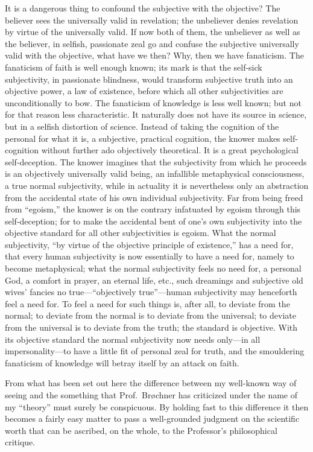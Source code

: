 \documentclass[12pt]{book}
\newcommand{\opage}[1]{\marginnote{\footnotesize\textit{[#1]}}}
\begin{document}
It is a dangerous thing to confound the subjective with the objective?
The believer sees the universally valid in revelation; the unbeliever
denies revelation by virtue of the universally valid. If now both of
them, the unbeliever as well as the believer, in selfish, passionate zeal
go and confuse the subjective universally valid with the objective, what
have we then? Why, then we have fanaticism. The fanaticism of faith is
well enough known; its mark is that the self-sick subjectivity, in
passionate blindness, would transform subjective truth into an objective
power, a law of existence, before which all other subjectivities are
unconditionally to
\opage{19}\setcounter{footnote}{0}%
bow. The fanaticism of knowledge is less well known; but not for that
reason less characteristic. It naturally does not have its source in
science, but in a selfish distortion of science. Instead of taking the
cognition of the personal for what it is, a subjective, practical
cognition, the knower makes self-cognition without further ado
objectively theoretical. It is a great psychological self-deception. The
knower imagines that the subjectivity from which he proceeds is an
objectively universally valid being, an infallible metaphysical
consciousness, a true normal subjectivity, while in actuality it is
nevertheless only an abstraction from the accidental state of his own
individual subjectivity. Far from being freed from ``egoism,'' the knower
is on the contrary infatuated by egoism through this self-deception; for
to make the accidental bent of one's own subjectivity into the objective
standard for all other subjectivities is egoism. What the normal
subjectivity, ``by virtue of the objective principle of existence,'' has a
need for, that every human subjectivity is now essentially to have a need
for, namely to become metaphysical; what the normal subjectivity feels no
need for, a personal God, a comfort in prayer, an eternal life, etc.,
such dreamings and subjective old wives' fancies no true---``objectively
true''---human subjectivity may henceforth feel a need for. To feel a
need for such things is, after all, to deviate from the normal; to
deviate from the normal is to deviate from the universal; to deviate from
the universal is to deviate from the truth; the standard is objective.
With its objective standard the normal subjectivity now needs only---in
all impersonality---to have a little fit of personal zeal for truth, and
the smouldering fanaticism of knowledge will betray itself by an attack
on faith.

From what has been set out here the difference between
\opage{20}\setcounter{footnote}{0}%
my well-known way of seeing and the something that Prof.\ Brøchner has
criticized under the name of my ``theory'' must surely be conspicuous. By
holding fast to this difference it then becomes a fairly easy matter to
pass a well-grounded judgment on the scientific worth that can be
ascribed, on the whole, to the Professor's philosophical critique.
\end{document}
